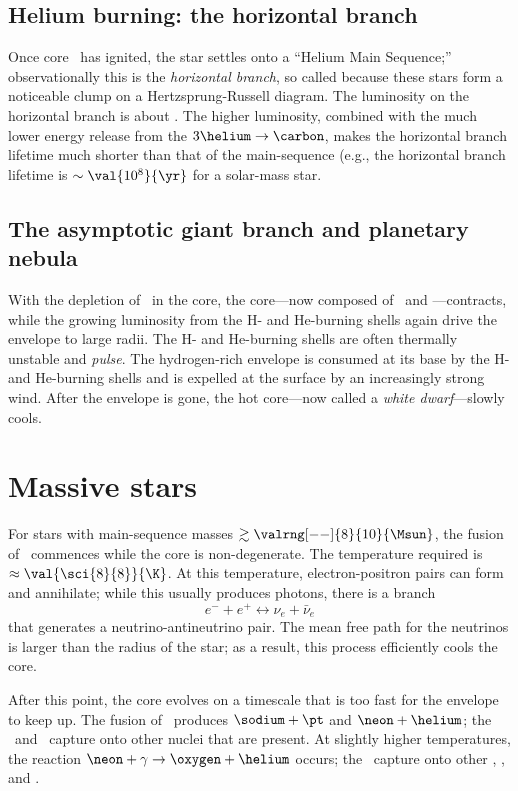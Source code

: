 \subsection{Helium burning: the horizontal branch}

Once core \helium\ has ignited, the star settles onto a ``Helium Main Sequence;'' observationally this is the \emph{horizontal branch}, so called because these stars form a noticeable clump on a Hertzsprung-Russell diagram.  The luminosity on the horizontal branch is about .  The higher luminosity, combined with the much lower energy release from the $3\helium\to\carbon$, makes the horizontal branch lifetime much shorter than that of the main-sequence (e.g., the horizontal branch lifetime is $\sim \val{10^{8}}{\yr}$ for a solar-mass star.

\subsection{The asymptotic giant branch and planetary nebula}

With the depletion of \helium\ in the core, the core---now composed of \carbon\ and \oxygen---contracts, while the growing luminosity from the H- and He-burning shells again drive the envelope to large radii.  The H- and He-burning shells are often thermally unstable and \emph{pulse}.  The hydrogen-rich envelope is consumed at its base by the H- and He-burning shells and is expelled at the surface by an increasingly strong wind.  After the envelope is gone, the hot core---now called a \emph{white dwarf}---slowly cools.

\section{Massive stars}

For stars with main-sequence masses $\gtrsim \valrng[--]{8}{10}{\Msun}$, the fusion of \carbon\ commences while the core is non-degenerate.  The temperature required is $\approx\val{\sci{8}{8}}{\K}$.  At this temperature, electron-positron pairs can form and annihilate; while this usually produces photons, there is a branch
\[ e^{-}+e^{+} \longleftrightarrow \nu_{e} + \bar{\nu}_{e}\]
that generates a neutrino-antineutrino pair. The mean free path for the neutrinos is larger than the radius of the star; as a result, this process efficiently cools the core.

After this point, the core evolves on a timescale that is too fast for the envelope to keep up.  The fusion of \carbon\ produces $\sodium+\pt$ and $\neon+\helium$; the \pt\ and \helium\ capture onto other nuclei that are present.  At slightly higher temperatures, the reaction $\neon+\gamma \to \oxygen+\helium$ occurs; the \helium\ capture onto other \oxygen, \neon, and \magnesium.

